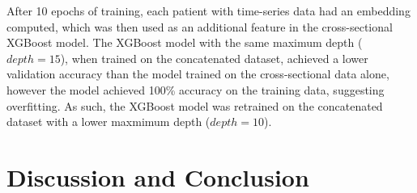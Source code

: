 \documentclass[12pt]{extarticle}
\begin{document}
      After 10 epochs of training, each patient with time-series data had an embedding computed, which was then used as an additional feature in the cross-sectional XGBoost model.
      The XGBoost model with the same maximum depth ($depth=15$), when trained on the concatenated dataset, achieved a lower validation accuracy than the model trained on the cross-sectional data alone, however the model achieved 100\% accuracy on the training data, suggesting overfitting.
      As such, the XGBoost model was retrained on the concatenated dataset with a lower maxmimum depth ($depth=10$).

\section{Discussion and Conclusion}

\pagebreak
\nocite{*}



\pagebreak


\end{document}
